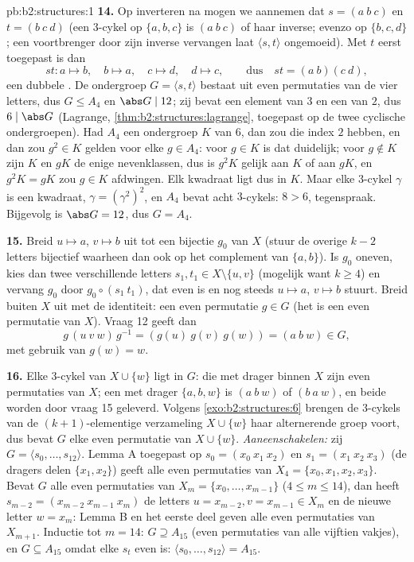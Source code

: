 \begin{solution}{pb:b2:structures:1}
\textbf{14.} Op inverteren na mogen we aannemen dat $s = (a\ b\ c)$
en $t = (b\ c\ d)$ (een $3$-cykel op $\{a,b,c\}$ is $(a\ b\ c)$ of
haar inverse; evenzo op $\{b,c,d\}$; een voortbrenger door zijn
inverse vervangen laat $\langle s, t\rangle$ ongemoeid). Met $t$
eerst toegepast is dan
\[
st \colon a \mapsto b,\quad b \mapsto a,\quad c \mapsto d,\quad
d \mapsto c, \qquad\text{dus}\quad st = (a\ b)(c\ d),
\]
een dubbele . De ondergroep $G = \langle s, t\rangle$
bestaat uit even permutaties van de vier letters, dus $G \leq A_4$
en $\abs G \mid 12$; zij bevat een element van  $3$ en een van
 $2$, dus $6 \mid \abs G$ (Lagrange,
\cref{thm:b2:structures:lagrange}, toegepast op de twee cyclische
ondergroepen). Had $A_4$ een ondergroep $K$ van  $6$, dan zou
die index $2$ hebben, en dan zou $g^2 \in K$ gelden voor elke $g
\in A_4$: voor $g \in K$ is dat duidelijk; voor $g \notin K$ zijn
$K$ en $gK$ de enige nevenklassen, dus is $g^2K$ gelijk aan $K$ of
aan $gK$, en $g^2K = gK$ zou $g \in K$ afdwingen. Elk kwadraat ligt
dus in $K$. Maar elke $3$-cykel $\gamma$ is een kwadraat, $\gamma =
(\gamma^2)^2$, en $A_4$ bevat acht $3$-cykels: $8 > 6$,
tegenspraak. Bijgevolg is $\abs G = 12$, dus $G = A_4$.

\textbf{15.} Breid $u \mapsto a$, $v \mapsto b$ uit tot een
bijectie $g_0$ van $X$ (stuur de overige $k - 2$ letters bijectief
waarheen dan ook op het complement van $\{a, b\}$). Is $g_0$
oneven, kies dan twee verschillende letters $s_1, t_1 \in X
\setminus \{u, v\}$ (mogelijk want $k \geq 4$) en vervang $g_0$
door $g_0 \circ (s_1\ t_1)$, dat even is en nog steeds $u \mapsto
a$, $v \mapsto b$ stuurt. Breid buiten $X$ uit met de identiteit:
een even permutatie $g \in G$ (het is een even permutatie van
$X$). Vraag 12 geeft dan
\[
g\,(u\ v\ w)\,g^{-1} = (g(u)\ g(v)\ g(w)) = (a\ b\ w) \in G,
\]
met gebruik van $g(w) = w$.

\textbf{16.} Elke $3$-cykel van $X \cup \{w\}$ ligt in $G$: die
met drager binnen $X$ zijn even permutaties van $X$; een met
drager $\{a, b, w\}$ is $(a\ b\ w)$ of $(b\ a\ w)$, en beide
worden door vraag 15 geleverd. Volgens \cref{exo:b2:structures:6}
brengen de $3$-cykels van de $(k+1)$-elementige verzameling $X
\cup \{w\}$ haar alternerende groep voort, dus bevat $G$ elke even
permutatie van $X \cup \{w\}$. \emph{Aaneenschakelen:} zij $G =
\langle s_0, \dots, s_{12}\rangle$. Lemma A toegepast op $s_0 =
(x_0\ x_1\ x_2)$ en $s_1 = (x_1\ x_2\ x_3)$ (de dragers delen
$\{x_1, x_2\}$) geeft alle even permutaties van $X_4 = \{x_0, x_1,
x_2, x_3\}$. Bevat $G$ alle even permutaties van $X_m = \{x_0,
\dots, x_{m-1}\}$ ($4 \leq m \leq 14$), dan heeft $s_{m-2} =
(x_{m-2}\ x_{m-1}\ x_m)$ de letters $u = x_{m-2}, v = x_{m-1} \in
X_m$ en de nieuwe letter $w = x_m$: Lemma B en het eerste deel
geven alle even permutaties van $X_{m+1}$. Inductie tot $m = 14$:
$G \supseteq A_{15}$ (even permutaties van alle vijftien vakjes),
en $G \subseteq A_{15}$ omdat elke $s_t$ even is: $\langle s_0,
\dots, s_{12}\rangle = A_{15}$.


\end{solution}
